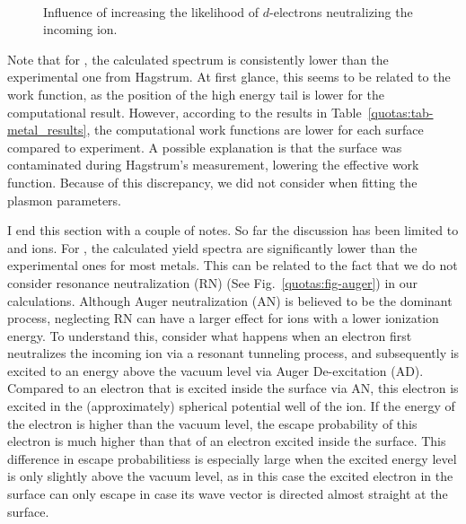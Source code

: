 \begin{refsection}
\begin{figure}[ht] 
    \centering 
    \begin{subfigure}[t]{0.49\textwidth} 
        \centering 
         
    \end{subfigure}%
    ~  
    \begin{subfigure}[t]{0.49\textwidth} 
        \centering 
         
    \end{subfigure} 
    \caption{\label{quotas:fig-d_influence} Influence of increasing the 
likelihood of $d$-electrons neutralizing the incoming ion.} 
\end{figure} 

Note that for , the calculated spectrum is consistently lower than the 
experimental one from Hagstrum. At first glance, this seems to be related to 
the work function, as the position of the high energy tail is lower for the 
computational result. However, according to the results in 
Table~\ref{quotas:tab-metal_results}, the computational work functions are 
lower for each surface compared to experiment. A possible explanation is that 
the  surface was contaminated during Hagstrum's measurement, lowering 
the effective work function. Because of this discrepancy, we did not consider 
 when fitting the plasmon parameters. 

I end this section with a couple of notes. So far the discussion has been limited 
to  and  ions. For , the calculated yield spectra 
are significantly lower than the experimental ones for most metals. This 
can be related to the fact that we do not consider resonance neutralization (RN)
(See Fig.~\ref{quotas:fig-auger}) in our calculations. Although Auger 
neutralization (AN) is believed to be the dominant process, neglecting RN 
can have a larger effect for ions with a lower ionization energy. 
To understand this, consider what happens when an electron first neutralizes
the incoming ion via a resonant tunneling process, and subsequently is excited
to an energy above the vacuum level via Auger De-excitation (AD). Compared 
to an electron that is excited inside the surface via AN, this electron is excited in 
the (approximately) spherical potential well of the ion. If the energy of the 
electron is higher than the vacuum level, the escape probability of this 
electron is much higher than that of an electron excited inside the surface. 
This difference in escape probabilitiess is especially large when the excited 
energy level is only slightly above the vacuum level, as in this case the 
excited electron in the surface can only escape in case its wave vector is 
directed almost straight at the surface.


\end{refsection}
